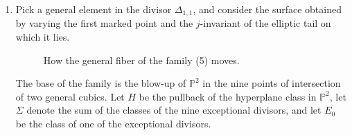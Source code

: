 \documentclass[10pt]{amsart}
\theoremstyle{definition}
\begin{document}
{\begin{enumerate}
Let $x$ be the class of a point in $\mathbb{P}^1$. The divisor classes restrict as follows
\begin{eqnarray*}
\psi_2 &=& -c_1\left(N_{\sigma_\Delta/\widetilde{E\times E}} \right)=\pi_1^*[p],\\
\delta_{1,1} &=& c_1\left( N_{\Gamma/\widetilde{E\times E}} \right) = -\pi_1^*[p],\\
\delta_{1,2} &=& \pi_1^*[p] +c_1\left( N_{\sigma/Y} \right) =\pi_1^*[p]-\pi_2^*(x),\\
\delta_0 &=& -12 c_1\left( N_{\sigma/Y} \right) = 12\pi_2^*(x),
\end{eqnarray*}
and we have
\begin{align*}
\psi_2\delta_{1,2} &= -1, & \psi_2\delta_0 =  \delta_0\delta_{1,2} &= 12, & \delta_0\delta_{1,1} &= -12.
\end{align*}
Suppose there exists an admissible cover for a fiber of this family totally ramified at the two marked points. Then, the restriction of the cover to the central rational component is totally ramified at the marked point and at one of the singular points, plus it has at least a simple ramification at the other singular point, a contradiction. 
Hence, this family has empty intersection with $\overline{\mathcal{DR}}_2(d)$, and we obtain
\[
{}-A_{\psi_2\delta_{1,2}}+12A_{\psi_2\delta_0} -12A_{\delta_0\delta_{1,1}} +12A_{\delta_0\delta_{1,2}}=0.
\]

\item \label{11} Pick a general element in the divisor $\Delta_{1,1}$, and consider the surface obtained by varying the first marked point and the $j$-invariant of the elliptic tail on which it lies.

\begin{figure}[htbp]
\centering
  
  

  \caption{How the general fiber of the family (5) moves.}
\end{figure}

The base of the family is the blow-up of $\mathbb{P}^2$ in the nine points of intersection of two general cubics. Let $H$ be the pullback of the hyperplane class in $\mathbb{P}^2$, let $\Sigma$ denote the sum of the classes of the nine exceptional divisors, and let $E_0$ be the class of one of the exceptional divisors.


\end{enumerate}}
\end{document}
